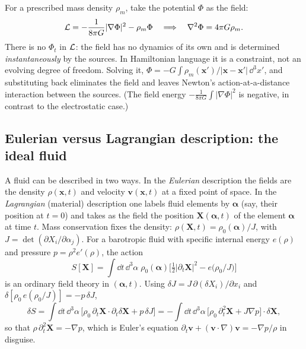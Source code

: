 \begin{example}
\label{ex:gravity}
For a prescribed mass density $\rho_m$, take the potential $\Phi$ as the field:
\begin{equation}
  \mathcal{L}=-\frac{1}{8\pi G}|\nabla\Phi|^2-\rho_m\Phi
  \quad\Longrightarrow\quad
  \nabla^2\Phi=4\pi G\rho_m .
\end{equation}
There is no $\Phi_t$ in $\mathcal{L}$: the field has no dynamics of its own and is
determined \emph{instantaneously} by the sources. In Hamiltonian language
it is a constraint, not an evolving degree of freedom. Solving it,
$\Phi=-G\!\int\rho_m(\mathbf{x}')/|\mathbf{x}-\mathbf{x}'|\,\dd^3x'$, and
substituting back eliminates the field and leaves Newton's
action-at-a-distance interaction between the sources. (The field energy
$-\frac{1}{8\pi G}\int|\nabla\Phi|^2$ is negative, in contrast to
the electrostatic case.)
\end{example}

\subsection{Eulerian versus Lagrangian description: the ideal fluid}
\label{sec:fluid}

A fluid can be described in two ways. In the \emph{Eulerian} description the
fields are the density $\rho(\mathbf{x},t)$ and velocity $\mathbf{v}(\mathbf{x},t)$
at a fixed point of space. In the \emph{Lagrangian} (material) description one
labels fluid elements by $\boldsymbol\alpha$ (say, their position at $t=0$) and
takes as the field the position $\mathbf{X}(\boldsymbol\alpha,t)$ of the element
$\boldsymbol\alpha$ at time $t$. Mass conservation fixes the density:
$\rho(\mathbf{X},t)=\rho_0(\boldsymbol\alpha)/J$, with
$J=\det(\partial X_i/\partial\alpha_j)$. For a barotropic fluid with specific
internal energy $e(\rho)$ and pressure $p=\rho^2e'(\rho)$, the action
\begin{equation}
  S[\mathbf{X}]=\int\!\dd t\,\dd^3\alpha\;\rho_0(\boldsymbol\alpha)
  \Big[\tfrac12|\partial_t\mathbf{X}|^2-e\big(\rho_0/J\big)\Big]
  \label{eq:fluid-action}
\end{equation}
is an ordinary field theory in $(\boldsymbol\alpha,t)$. Using
$\delta J=J\,\partial(\delta X_i)/\partial x_i$ and
$\delta[\rho_0\,e(\rho_0/J)]=-p\,\delta J$,
\[
  \delta S=\int\!\dd t\,\dd^3\alpha\,\big[\rho_0\,\partial_t\mathbf{X}\!\cdot\!\partial_t\delta\mathbf{X}+p\,\delta J\big]
  =-\int\!\dd t\,\dd^3\alpha\,\big[\rho_0\,\partial_t^2\mathbf{X}+J\nabla p\big]\!\cdot\!\delta\mathbf{X},
\]
so that $\rho\,\partial_t^2\mathbf{X}=-\nabla p$, which is Euler's equation
$\partial_t\mathbf{v}+(\mathbf{v}\!\cdot\!\nabla)\mathbf{v}=-\nabla p/\rho$ in
disguise.

